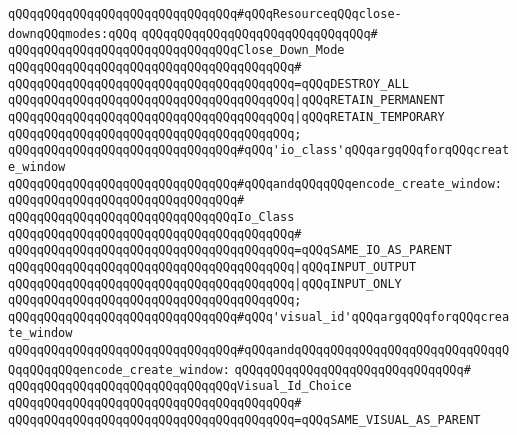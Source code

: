 \verb|qQQqqQQqqQQqqQQqqQQqqQQqqQQqqQQq#qQQqResourceqQQqclose-downqQQqmodes:qQQq|\newline
\verb|qQQqqQQqqQQqqQQqqQQqqQQqqQQqqQQq#|\newline
\verb|qQQqqQQqqQQqqQQqqQQqqQQqqQQqqQQqClose_Down_Mode|\newline
\verb|qQQqqQQqqQQqqQQqqQQqqQQqqQQqqQQqqQQqqQQq#|\newline
\verb|qQQqqQQqqQQqqQQqqQQqqQQqqQQqqQQqqQQqqQQq=qQQqDESTROY_ALL|\newline
\verb|qQQqqQQqqQQqqQQqqQQqqQQqqQQqqQQqqQQqqQQq|\verb#|qQQqRETAIN_PERMANENT#\newline
\verb|qQQqqQQqqQQqqQQqqQQqqQQqqQQqqQQqqQQqqQQq|\verb#|qQQqRETAIN_TEMPORARY#\newline
\verb|qQQqqQQqqQQqqQQqqQQqqQQqqQQqqQQqqQQqqQQq;|\newline
\newline
\verb|qQQqqQQqqQQqqQQqqQQqqQQqqQQqqQQq#qQQq'io_class'qQQqargqQQqforqQQqcreate_window|\newline
\verb|qQQqqQQqqQQqqQQqqQQqqQQqqQQqqQQq#qQQqandqQQqqQQqencode_create_window:|\newline
\verb|qQQqqQQqqQQqqQQqqQQqqQQqqQQqqQQq#|\newline
\verb|qQQqqQQqqQQqqQQqqQQqqQQqqQQqqQQqIo_Class|\newline
\verb|qQQqqQQqqQQqqQQqqQQqqQQqqQQqqQQqqQQqqQQq#|\newline
\verb|qQQqqQQqqQQqqQQqqQQqqQQqqQQqqQQqqQQqqQQq=qQQqSAME_IO_AS_PARENT|\newline
\verb|qQQqqQQqqQQqqQQqqQQqqQQqqQQqqQQqqQQqqQQq|\verb#|qQQqINPUT_OUTPUT#\newline
\verb|qQQqqQQqqQQqqQQqqQQqqQQqqQQqqQQqqQQqqQQq|\verb#|qQQqINPUT_ONLY#\newline
\verb|qQQqqQQqqQQqqQQqqQQqqQQqqQQqqQQqqQQqqQQq;|\newline
\newline
\verb|qQQqqQQqqQQqqQQqqQQqqQQqqQQqqQQq#qQQq'visual_id'qQQqargqQQqforqQQqcreate_window|\newline
\verb|qQQqqQQqqQQqqQQqqQQqqQQqqQQqqQQq#qQQqandqQQqqQQqqQQqqQQqqQQqqQQqqQQqqQQqqQQqqQQqencode_create_window:|\newline
\verb|qQQqqQQqqQQqqQQqqQQqqQQqqQQqqQQq#|\newline
\verb|qQQqqQQqqQQqqQQqqQQqqQQqqQQqqQQqVisual_Id_Choice|\newline
\verb|qQQqqQQqqQQqqQQqqQQqqQQqqQQqqQQqqQQqqQQq#|\newline
\verb|qQQqqQQqqQQqqQQqqQQqqQQqqQQqqQQqqQQqqQQq=qQQqSAME_VISUAL_AS_PARENT|\newline
